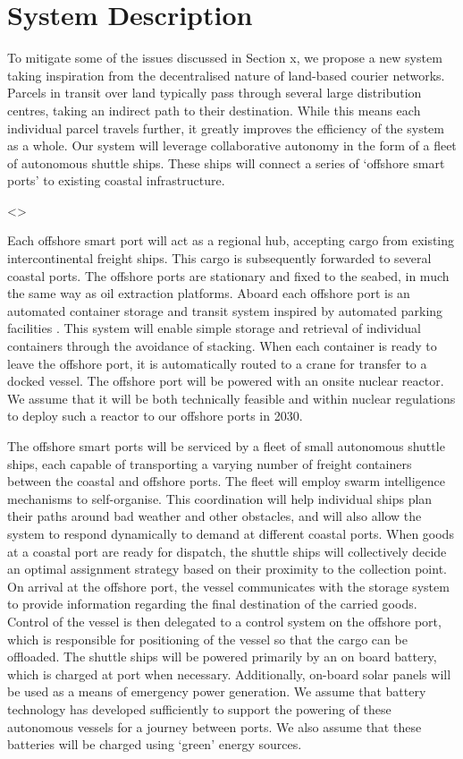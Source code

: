 \section{System Description}
To mitigate some of the issues discussed in Section x, we propose a new system taking inspiration from the decentralised nature of land-based courier networks. Parcels in transit over land typically pass through several large distribution centres, taking an indirect path to their destination. While this means each individual parcel travels further, it greatly improves the efficiency of the system as a whole. Our system will leverage collaborative autonomy in the form of a fleet of autonomous shuttle ships. These ships will connect a series of `offshore smart ports’ to existing coastal infrastructure.

<>

Each offshore smart port will act as a regional hub, accepting cargo from existing intercontinental freight ships. This cargo is subsequently forwarded to several coastal ports. The offshore ports are stationary and fixed to the seabed, in much the same way as oil extraction platforms. Aboard each offshore port is an automated container storage and transit system inspired by automated parking facilities \cite{Mathijssen2007}. This system will enable simple storage and retrieval of individual containers through the avoidance of stacking. When each container is ready to leave the offshore port, it is automatically routed to a crane for transfer to a docked vessel. The offshore port will be powered with an onsite nuclear reactor. We assume that it will be both technically feasible and within nuclear regulations to deploy such a reactor to our offshore ports in 2030.

The offshore smart ports will be serviced by a fleet of small autonomous shuttle ships, each capable of transporting a varying number of freight containers between the coastal and offshore ports. The fleet will employ swarm intelligence mechanisms to self-organise. This coordination will help individual ships plan their paths around bad weather and other obstacles, and will also allow the system to respond dynamically to demand at different coastal ports. When goods at a coastal port are ready for dispatch, the shuttle ships will collectively decide an optimal assignment strategy based on their proximity to the collection point. On arrival at the offshore port, the vessel communicates with the storage system to provide information regarding the final destination of the carried goods. Control of the vessel is then delegated to a control system on the offshore port, which is responsible for positioning of the vessel so that the cargo can be offloaded. The shuttle ships will be powered primarily by an on board battery, which is charged at port when necessary. Additionally, on-board solar panels will be used as a means of emergency power generation. We assume that battery technology has developed sufficiently to support the powering of these autonomous vessels for a journey between ports. We also assume that these batteries will be charged using `green’ energy sources.


